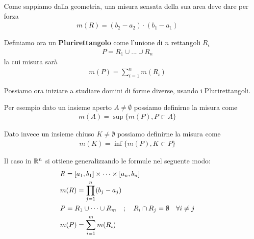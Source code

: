 Come sappiamo dalla geometria, una misura sensata della sua area deve dare per forza
\begin{align}
	m(R)=(b_2 - a_2)\cdot(b_1-a_1)
\end{align}

Definiamo ora un \textbf{Plurirettangolo} come l'unione di $n$ rettangoli $R_i$ 
\begin{align}
	P=R_1\cup ... \cup R_n
\end{align}
la cui misura sarà 
\begin{align}
	m(P)= \sum_{i=1}^{n} m(R_i)
\end{align}

Possiamo ora iniziare a studiare domini di forme diverse, usando i Plurirettangoli.

Per esempio dato un insieme aperto $A\neq \emptyset$ possiamo definirne la misura come
\begin{align}
	m(A)=\sup\{ m(P), P\subset A \}
\end{align}

Dato invece un insieme  chiuso $K\neq \emptyset$ possiamo definirne la misura come
\begin{align}
	m(K)=\inf\{ m(P), K\subset P \}
\end{align}

\begin{figure}[!htb]
\end{figure}

Il caso in $\mathbb{R}^n$ si ottiene generalizzando le formule nel seguente modo:
\begin{align}
	{}&R=[a_1,b_1]\times \dots \times [a_n,b_n]\\
	&m(R)=\prod_{j=1}^{n}(b_j-a_j)\\
	&P= R_1 \cup \dots \cup R_m \quad ; \quad R_i \cap R_j = \emptyset \quad \forall i \neq j\\
	&m(P)=\sum_{i=1}^{m}m(R_i)
\end{align}

